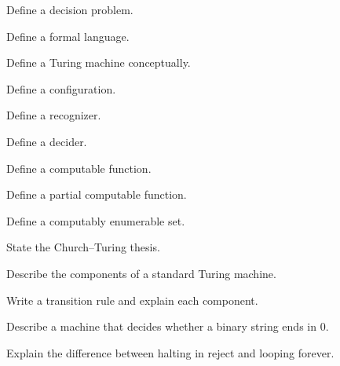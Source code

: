 \begin{exercise}[1]
Define a decision problem.
\end{exercise}

\begin{exercise}[1]
Define a formal language.
\end{exercise}

\begin{exercise}[1]
Define a Turing machine conceptually.
\end{exercise}

\begin{exercise}[1]
Define a configuration.
\end{exercise}

\begin{exercise}[1]
Define a recognizer.
\end{exercise}

\begin{exercise}[1]
Define a decider.
\end{exercise}

\begin{exercise}[1]
Define a computable function.
\end{exercise}

\begin{exercise}[1]
Define a partial computable function.
\end{exercise}

\begin{exercise}[1]
Define a computably enumerable set.
\end{exercise}

\begin{exercise}[1]
State the Church--Turing thesis.
\end{exercise}

\begin{exercise}[2]
Describe the components of a standard Turing machine.
\end{exercise}

\begin{exercise}[2]
Write a transition rule and explain each component.
\end{exercise}

\begin{exercise}[2]
Describe a machine that decides whether a binary string ends in \(0\).
\end{exercise}

\begin{exercise}[2]
Explain the difference between halting in reject and looping forever.
\end{exercise}

